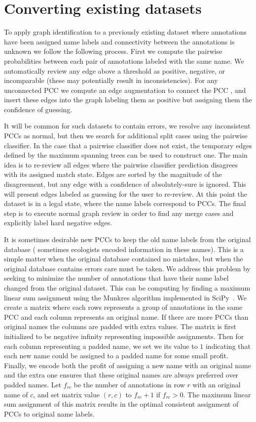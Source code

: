 \section{Converting existing datasets}\label{sec:rename}
To apply graph identification to a previously existing dataset where annotations have been assigned name labels and
connectivity between the annotations is unknown we follow the following process. First we compute the pairwise
probabilities between each pair of annotations labeled with the same name. We automatically review any edge above a
threshold as positive, negative, or incomparable (these may potentially result in inconsistencies). For any unconnected
PCC we compute an edge augmentation to connect the PCC \cite{eswaran_augmentation_1976,khuller_approximation_1993}, and
insert these edges into the graph labeling them as positive but assigning them the confidence of guessing.

It will be common for such datasets to contain errors, we resolve any inconsistent PCCs as normal, but then we search
for additional split cases using the pairwise classifier. In the case that a pairwise classifier does not exist, the
temporary edges defined by the maximum spanning trees can be used to construct one. The main idea is to re-review all
edges where the pairwise classifier prediction disagrees with its assigned match state. Edges are sorted by the
magnitude of the disagreement, but any edge with a confidence of absolutely-sure is ignored. This will present edges
labeled as guessing for the user to re-review. At this point the dataset is in a legal state, where the name labels
correspond to PCCs. The final step is to execute normal graph review in order to find any merge cases and explicitly
label hard negative edges.

It is sometimes desirable new PCCs to keep the old name labels from the original database (\eg{} sometimes ecologists
encoded information in these names). This is a simple matter when the original database contained no mistakes, but when
the original database contains errors care must be taken. We address this problem by seeking to minimize the number of
annotations that have their name label changed from the original dataset. This can be computing by finding a maximum
linear sum assignment using the Munkres algorithm implemented in SciPy~\cite{eric_jones_scipy_2001}. We create a matrix
where each rows represents a group of annotations in the same PCC and each column represents an original name. If there
are more PCCs than original names the columns are padded with extra values. The matrix is first initialized to be
negative infinity representing impossible assignments. Then for each column representing a padded name, we set we its
value to $1$ indicating that each new name could be assigned to a padded name for some small profit. Finally, we encode
both the profit of assigning a new name with an original name and the extra one ensures that these original names are
always preferred over padded names. Let $f_{rc}$ be the number of annotations in row $r$ with an original name of $c$,
and set matrix value $(r, c)$ to $f_{rc} + 1$ if $f_{rc} > 0$. The maximum linear sum assignment of this matrix results
in the optimal consistent assignment of PCCs to original name labels.
  
